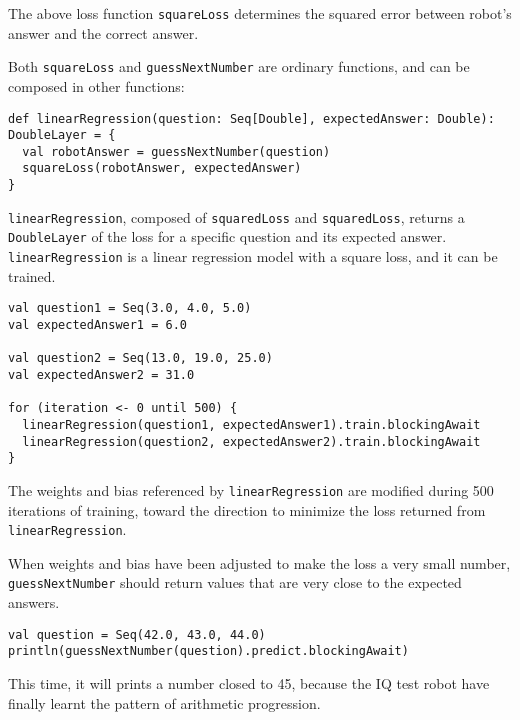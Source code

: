 The above loss function \lstinline{squareLoss} determines the squared error between robot's answer and the correct answer.

Both \lstinline{squareLoss} and \lstinline{guessNextNumber} are ordinary functions, and can be composed in other functions:

\begin{lstlisting}[float={htbp},caption={A differentiable function to train a linear regression model}]
def linearRegression(question: Seq[Double], expectedAnswer: Double): DoubleLayer = {
  val robotAnswer = guessNextNumber(question)
  squareLoss(robotAnswer, expectedAnswer)
}
\end{lstlisting}

\lstinline{linearRegression}, composed of \lstinline{squaredLoss} and \lstinline{squaredLoss}, returns a \lstinline{DoubleLayer} of the loss for a specific question and its expected answer. \lstinline{linearRegression} is a linear regression model with a square loss, and it can be trained.

\begin{lstlisting}[float={htbp},caption={Training for 500 iterations}]
val question1 = Seq(3.0, 4.0, 5.0)
val expectedAnswer1 = 6.0

val question2 = Seq(13.0, 19.0, 25.0)
val expectedAnswer2 = 31.0

for (iteration <- 0 until 500) {
  linearRegression(question1, expectedAnswer1).train.blockingAwait
  linearRegression(question2, expectedAnswer2).train.blockingAwait
}
\end{lstlisting}

The weights and bias referenced by \lstinline{linearRegression} are modified during 500 iterations of training, toward the direction to minimize the loss returned from \lstinline{linearRegression}.

When weights and bias have been adjusted to make the loss a very small number, \lstinline{guessNextNumber} should return values that are very close to the expected answers.

\begin{lstlisting}[float={htbp},caption={Inference on a trained model},label={predict_trained}]
val question = Seq(42.0, 43.0, 44.0)
println(guessNextNumber(question).predict.blockingAwait)
\end{lstlisting}

This time, it will prints a number closed to 45, because the IQ test robot have finally learnt the pattern of arithmetic progression.

